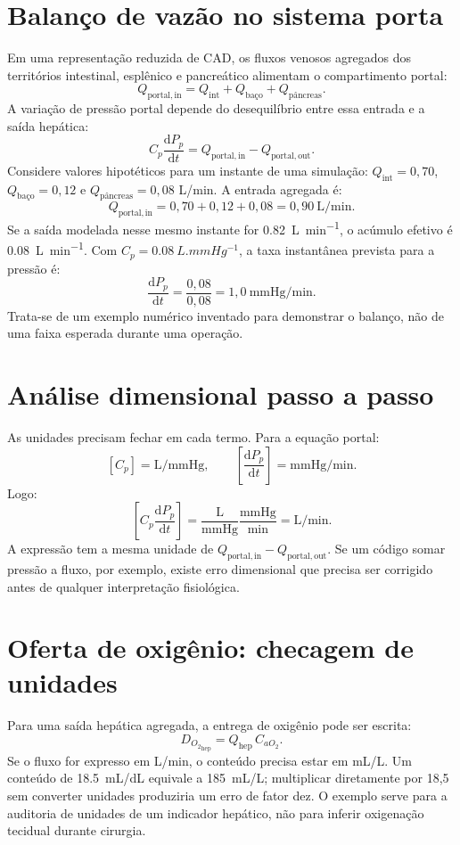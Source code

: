 \documentclass[11pt,a4paper,oneside]{book}
\newcommand{\diff}[2]{\frac{\mathrm{d}#1}{\mathrm{d}#2}}
\newcommand{\Qportin}{Q_{\mathrm{portal,in}}}
\newcommand{\Qportout}{Q_{\mathrm{portal,out}}}
\newcommand{\Do}{D_{O_2}}
\begin{document}
\section{Balanço de vazão no sistema porta}
Em uma representação reduzida de CAD, os fluxos venosos agregados dos territórios intestinal, esplênico e pancreático alimentam o compartimento portal:
\begin{equation}
  \Qportin=Q_{\mathrm{int}}+Q_{\mathrm{baço}}+Q_{\mathrm{pâncreas}}.
\end{equation}
A variação de pressão portal depende do desequilíbrio entre essa entrada e a saída hepática:
\begin{equation}
  C_p\diff{P_p}{t}=\Qportin-\Qportout.
\end{equation}
Considere valores hipotéticos para um instante de uma simulação: $Q_{\mathrm{int}}=0{,}70$, $Q_{\mathrm{baço}}=0{,}12$ e $Q_{\mathrm{pâncreas}}=0{,}08$ L/min. A entrada agregada é:
\[
\Qportin=0{,}70+0{,}12+0{,}08=0{,}90\ \mathrm{L/min}.
\]
Se a saída modelada nesse mesmo instante for \SI{0.82}{L.min^{-1}}, o acúmulo efetivo é \SI{0.08}{L.min^{-1}}. Com $C_p=\SI{0.08}{L.mmHg^{-1}}$, a taxa instantânea prevista para a pressão é:
\[
\diff{P_p}{t}=\frac{0{,}08}{0{,}08}
=1{,}0\ \mathrm{mmHg/min}.
\]
Trata-se de um exemplo numérico inventado para demonstrar o balanço, não de uma faixa esperada durante uma operação.

\section{Análise dimensional passo a passo}
As unidades precisam fechar em cada termo. Para a equação portal:
\[
[C_p]=\mathrm{L/mmHg},\qquad
[\diff{P_p}{t}]=\mathrm{mmHg/min}.
\]
Logo:
\[
[C_p\diff{P_p}{t}]
=\frac{\mathrm{L}}{\mathrm{mmHg}}
 \frac{\mathrm{mmHg}}{\mathrm{min}}
=\mathrm{L/min}.
\]
A expressão tem a mesma unidade de $\Qportin-\Qportout$. Se um código somar pressão a fluxo, por exemplo, existe erro dimensional que precisa ser corrigido antes de qualquer interpretação fisiológica.

\section{Oferta de oxigênio: checagem de unidades}
Para uma saída hepática agregada, a entrega de oxigênio pode ser escrita:
\begin{equation}
  \Do_{\mathrm{hep}}=Q_{\mathrm{hep}}\,C_{aO_2}.
\end{equation}
Se o fluxo for expresso em L/min, o conteúdo precisa estar em mL/L. Um conteúdo de \SI{18.5}{mL/dL} equivale a \SI{185}{mL/L}; multiplicar diretamente por 18,5 sem converter unidades produziria um erro de fator dez. O exemplo serve para a auditoria de unidades de um indicador hepático, não para inferir oxigenação tecidual durante cirurgia.
\end{document}
